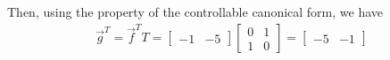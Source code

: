 \begin{enumerate}
{Then, using the property of the controllable canonical form, we have
\begin{align*}
\vec{g}^T = \vec{f}^T T =
\begin{bmatrix}
-1 & -5
\end{bmatrix}
\begin{bmatrix}
0 & 1\\
1 & 0
\end{bmatrix}=
\begin{bmatrix}
-5 & -1
\end{bmatrix}
\end{align*}
}






\end{enumerate}
